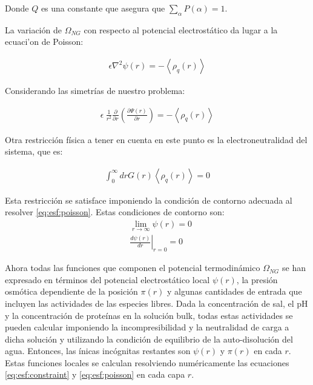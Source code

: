 \noindent Donde $Q$ es una constante que asegura que $\sum_\alpha P(\alpha) = 1$.


La variaci\'on de $\Omega_{NG}$ con respecto al potencial electrost\'atico da lugar a la ecuaci'on de Poisson:

\begin{align}
	\epsilon\nabla^2\psi(r) = -\left<\rho_q(r)\right>
\end{align}

Considerando las simetr\'ias de nuestro problema:

\begin{align}
	\epsilon ~ \frac{1}{r^2} \frac{\partial}{\partial r}\left(\frac{\partial \Psi(r)}{\partial r}\right) = -\left<\rho_q(r)\right>
	\label{eq:esf:poisson}
\end{align}

Otra restricci\'on f\'isica a tener en cuenta en este punto es la electroneutralidad del sistema, que es:

\begin{align}
	\int_0^\infty{drG(r) \left<\rho_q(r)\right>} = 0
\end{align}

Esta restricci\'on se satisface imponiendo la condici\'on de contorno adecuada al resolver \ref{eq:esf:poisson}. Estas condiciones de contorno son:
\begin{align}
	&  \lim_{r\to\infty}\psi(r) = 0 \\
	&  \left.\frac{d\psi(r)}{dr}\right|_{r=0} = 0
	\label{eq:esf:contorno}
	\end{align}
	

Ahora todas las funciones que componen el potencial termodin\'amico $\Omega_{NG}$ se han expresado en t\'erminos del potencial electrost\'atico local $\psi(r)$, la presi\'on osm\'otica dependiente de la posici\'on $\pi(r)$ y algunas cantidades de entrada que incluyen las actividades de las especies libres.
Dada la concentraci\'on de sal, el pH y la concentraci\'on de prote\'inas en la soluci\'on bulk, todas estas actividades se pueden calcular imponiendo la incompresibilidad y la neutralidad de carga a dicha soluci\'on y utilizando la condici\'on de equilibrio de la auto-disoluci\'on del agua.
Entonces, las \'inicas inc\'ognitas restantes son $\psi(r)$ y $\pi(r)$ en cada $r$.
Estas funciones locales se calculan resolviendo num\'ericamente las ecuaciones \ref{eq:esf:constraint} y \ref{eq:esf:poisson} en cada capa $r$.
 

